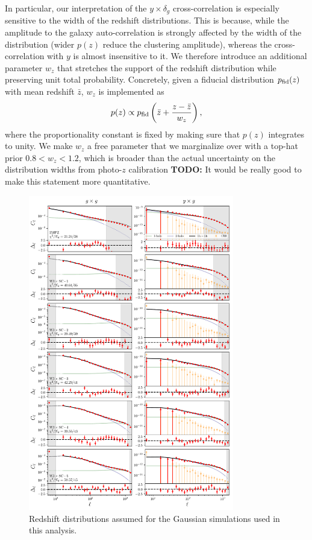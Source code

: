 \documentclass[useAMS,usenatbib]{mn2e}
\newcommand{\todo}[1]{{\bf TODO:} #1}
\begin{document}
      In particular, our interpretation of the $y\times \delta_g$ cross-correlation is especially sensitive to the width of the redshift distributions. This is because, while the amplitude to the galaxy auto-correlation is strongly affected by the width of the distribution (wider $p(z)$ reduce the clustering amplitude), whereas the cross-correlation with $y$ is almost insensitive to it. We therefore introduce an additional parameter $w_z$ that stretches the support of the redshift distribution while preserving unit total probability. Concretely, given a fiducial distribution $p_{\rm fid}(z)$ with mean redshift $\bar{z}$, $w_z$ is implemented as
      \begin{equation}
        p(z)\propto p_{\rm fid}\left(\bar{z}+\frac{z-\bar{z}}{w_z}\right),
      \end{equation}
      where the proportionality constant is fixed by making sure that $p(z)$ integrates to unity. We make $w_z$ a free parameter that we marginalize over with a top-hat prior $0.8<w_z<1.2$, which is broader than the actual uncertainty on the distribution widths from photo-$z$ calibration \todo{It would be really good to make this statement more quantitative}.
  \begin{figure}
    \centering
    \includegraphics[width=0.8\textwidth]{./figures/fits.pdf}
    \caption{Redshift distributions assumed for the Gaussian simulations used in this analysis.}
    \label{fig:cls}
  \end{figure}
\end{document}
